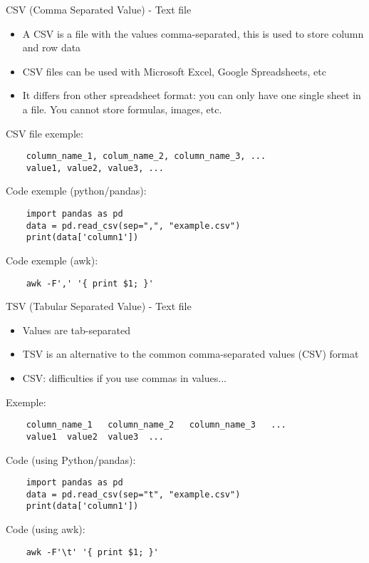 \documentclass[handout]{beamer}[10pt, usepdftitle=false]
\begin{document}
	\begin{frame}[fragile]
	
	CSV (Comma Separated Value) - Text file
	\vspace*{0.6em}
	
	\begin{itemize}
		\item{A CSV is a file with the values comma-separated, this is used to store column and row data}
		\item{CSV files can be used with Microsoft Excel, Google Spreadsheets, etc}
		\item{It differs fron other spreadsheet format: you can only have one single sheet in a file. You cannot store formulas, images, etc.}
	\end{itemize}		
	
	CSV file exemple:
	\begin{verbatim}
	column_name_1, colum_name_2, column_name_3, ...
	value1, value2, value3, ...
	\end{verbatim}

	Code exemple (python/pandas):
	\begin{verbatim}
	import pandas as pd
	data = pd.read_csv(sep=",", "example.csv")
	print(data['column1'])
	\end{verbatim}

	Code exemple (awk):
	\begin{verbatim}
	awk -F',' '{ print $1; }'
	\end{verbatim}

	\end{frame}
	\begin{frame}[fragile]
	
	TSV (Tabular Separated Value) - Text file
	\vspace*{0.6em}	

	\begin{itemize}
		\item{Values are tab-separated}
		\item{TSV is an alternative to the common comma-separated values (CSV) format}
		\item{CSV: difficulties if you use commas in values...}	
	\end{itemize}		

	Exemple:
	\begin{verbatim}
	column_name_1	column_name_2	column_name_3	...
	value1	value2	value3	...		
	\end{verbatim}

	Code (using Python/pandas):
	\begin{verbatim}
	import pandas as pd
	data = pd.read_csv(sep="t", "example.csv")
	print(data['column1'])
	\end{verbatim}
 	
 	Code (using awk):
 	\begin{verbatim}
 	awk -F'\t' '{ print $1; }'	
 	\end{verbatim}
 	
	\end{frame}
\end{document}
